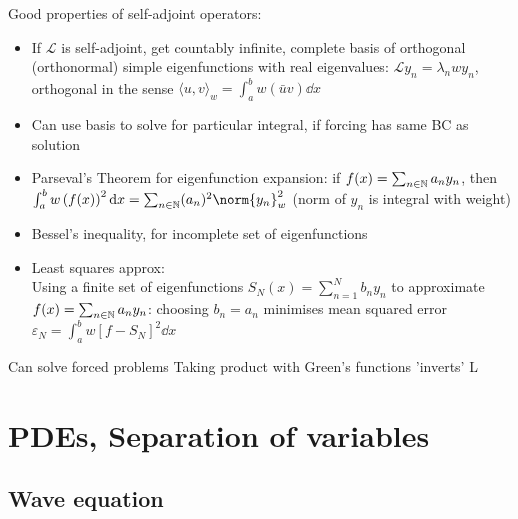Good properties of self-adjoint operators:
\begin{itemize}
    \item If $\mathcal{L}$ is self-adjoint, get countably infinite, complete basis of orthogonal (orthonormal) simple eigenfunctions with real eigenvalues: $\mathcal{L}y_n = \lambda_n wy_n$, orthogonal in the sense $\langle u,v \rangle_w = \int_a^b w (\bar{u} v) \dd{x}$
    \item Can use basis to solve for particular integral, if forcing has same BC as solution
\end{itemize}

\begin{itemize}
    \item Parseval's Theorem for eigenfunction expansion: if $f(x) = \sum_{n\in\mathbb{N}} a_n y_n$, then $\int_a^b w \left(f(x)\right)^2 \dd{x} = \sum_{n\in\N} (a_n)^2 \norm{y_n}^2_w$ (norm of $y_n$ is integral with weight)
    \item Bessel's inequality, for incomplete set of eigenfunctions
    \item Least squares approx: \\
          Using a finite set of eigenfunctions $S_N(x) = \sum_{n=1}^N b_n y_n$ to approximate $f(x) = \sum_{n\in\mathbb{N}} a_n y_n$: choosing $b_n = a_n$ minimises mean squared error $\varepsilon_N = \int_a^b w \left[ f - S_N\right]^2 \dd{x}$
\end{itemize}

Can solve forced problems
Taking product with Green's functions 'inverts' L


\section{PDEs, Separation of variables}

\subsection*{Wave equation}

